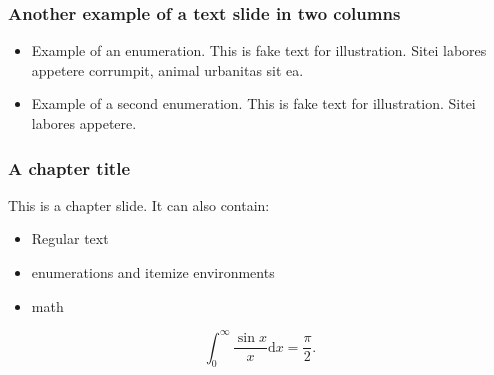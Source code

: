 \documentclass[t,aspectratio=169]{beamer}
\begin{document}
\begin{imageframe}[bgimage=rightpic.jpg]
  \twocolumn  %
  \frametitle{Another example of a text slide in two columns}
  
  \begin{itemize}
    \item Example of an enumeration. This is fake text for illustration. Sitei labores appetere corrumpit, animal urbanitas sit ea.
    \item Example of a second enumeration. This is fake text for illustration. Sitei labores appetere.
          \newpage  %
  \end{itemize}
  
\end{imageframe}
\onecolumn %

\begin{chapterframe}
  \frametitle{A chapter title}
  
  This is a chapter slide. It can also contain:
  \begin{itemize}
    \item Regular text
    \item enumerations and itemize environments
    \item math
  \end{itemize}
  \[
    \int_0^\infty \frac{\sin x}{x} \text{d}x=\frac{\pi}{2}.
  \]
\end{chapterframe}
\end{document}
